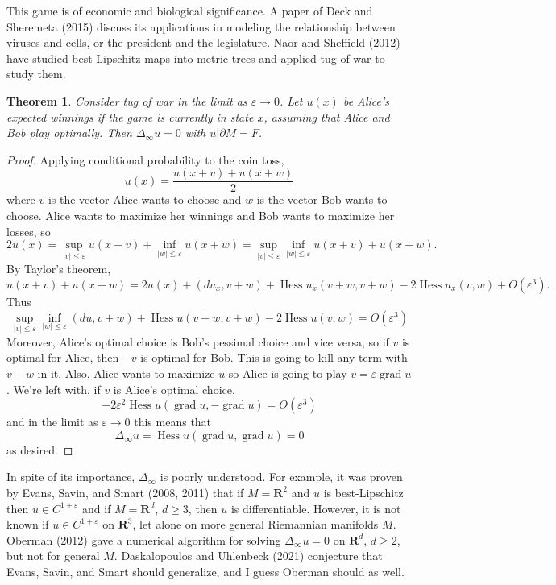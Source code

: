 \documentclass[reqno,12pt,letterpaper]{amsart}
\newcommand{\RR}{\mathbf{R}}
\DeclareMathOperator{\Hess}{Hess}
\DeclareMathOperator{\grad}{grad}
\newtheorem{theorem}{Theorem}[section]
\theoremstyle{definition}
\begin{document}
This game is of economic and biological significance. A paper of Deck and Sheremeta (2015) discuss its applications in modeling the relationship between viruses and cells, or the president and the legislature.
Naor and Sheffield (2012) have studied best-Lipschitz maps into metric trees and applied tug of war to study them.

\begin{theorem}
Consider tug of war in the limit as $\varepsilon \to 0$.
Let $u(x)$ be Alice's expected winnings if the game is currently in state $x$, assuming that Alice and Bob play optimally.
Then $\Delta_\infty u = 0$ with $u|\partial M = F$.
\end{theorem}
\begin{proof}
Applying conditional probability to the coin toss,
$$u(x) = \frac{u(x + v) + u(x + w)}{2}$$
where $v$ is the vector Alice wants to choose and $w$ is the vector Bob wants to choose.
Alice wants to maximize her winnings and Bob wants to maximize her losses, so
$$2u(x) = \sup_{|v| \leq \varepsilon} u(x + v) + \inf_{|w| \leq \varepsilon} u(x + w) = \sup_{|v| \leq \varepsilon} \inf_{|w| \leq \varepsilon} u(x + v) + u(x + w).$$
By Taylor's theorem,
$$u(x + v) + u(x + w) = 2u(x) + (du_x, v + w) + \Hess u_x(v + w, v + w) - 2 \Hess u_x(v, w) + O(\varepsilon^3).$$
Thus
$$\sup_{|v| \leq \varepsilon} \inf_{|w| \leq \varepsilon} (du, v + w) + \Hess u(v + w, v + w) - 2 \Hess u(v, w) = O(\varepsilon^3)$$
Moreover, Alice's optimal choice is Bob's pessimal choice and vice versa, so if $v$ is optimal for Alice, then $-v$ is optimal for Bob.
This is going to kill any term with $v + w$ in it. Also, Alice wants to maximize $u$ so Alice is going to play $v = \varepsilon\grad u$. We're left with, if $v$ is Alice's optimal choice,
$$-2\varepsilon^2 \Hess u(\grad u, -\grad u) = O(\varepsilon^3)$$
and in the limit as $\varepsilon \to 0$ this means that
$$\Delta_\infty u = \Hess u(\grad u, \grad u) = 0$$
as desired.
\end{proof}

In spite of its importance, $\Delta_\infty$ is poorly understood.
For example, it was proven by Evans, Savin, and Smart (2008, 2011) that if $M = \RR^2$ and $u$ is best-Lipschitz then $u \in C^{1 + \varepsilon}$ and if $M = \RR^d$, $d \geq 3$, then $u$ is differentiable.
However, it is not known if $u \in C^{1 + \varepsilon}$ on $\RR^3$, let alone on more general Riemannian manifolds $M$.
Oberman (2012) gave a numerical algorithm for solving $\Delta_\infty u = 0$ on $\RR^d$, $d \geq 2$, but not for general $M$.
Daskalopoulos and Uhlenbeck (2021) conjecture that Evans, Savin, and Smart should generalize, and I guess Oberman should as well.
\end{document}
